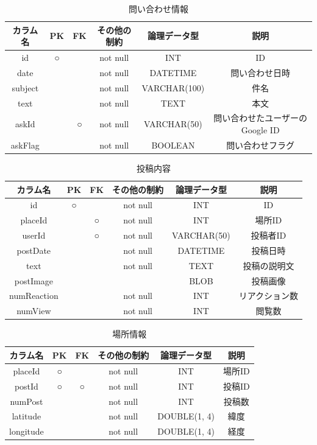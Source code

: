 \begin{table}[H]
    \centering
    \caption{問い合わせ情報}
    \label{tb:ask}
    \begin{tabular}{|c|c|c|c|c|c|} \hline
        カラム名 & PK & FK & その他の制約 & 論理データ型 & 説明 \\ \hline\hline
        id & ○ & & not null & INT & ID \\ \hline
        date & & & not null & DATETIME & 問い合わせ日時 \\ \hline
        subject & & & not null & VARCHAR(100) & 件名 \\ \hline
        text & & & not null & TEXT & 本文 \\ \hline
        askId & & ○ & not null & VARCHAR(50) & 問い合わせたユーザーのGoogle ID \\ \hline
        askFlag & & & not null & BOOLEAN & 問い合わせフラグ \\ \hline
    \end{tabular}
\end{table}

\begin{table}[H]
    \centering
    \caption{投稿内容}
    \label{tb:post}
    \begin{tabular}{|c|c|c|c|c|c|} \hline
        カラム名 & PK & FK & その他の制約 & 論理データ型 & 説明 \\ \hline\hline
        id & ○ & & not null & INT & ID \\ \hline
        placeId & & ○ & not null & INT & 場所ID \\ \hline
        userId & & ○ & not null & VARCHAR(50) & 投稿者ID \\ \hline
        postDate & & & not null & DATETIME & 投稿日時 \\ \hline
        text & & & not null & TEXT & 投稿の説明文 \\ \hline
        postImage & & & & BLOB & 投稿画像 \\ \hline
        numReaction & & & not null & INT & リアクション数 \\ \hline
        numView & & & not null & INT & 閲覧数 \\ \hline
    \end{tabular}
\end{table}

\begin{table}[H]
    \centering
    \caption{場所情報}
    \label{tb:place}
    \begin{tabular}{|c|c|c|c|c|c|} \hline
        カラム名 & PK & FK & その他の制約 & 論理データ型 & 説明 \\ \hline\hline
        placeId & ○ & & not null & INT & 場所ID \\ \hline
        postId & ○ & ○ & not null & INT & 投稿ID \\ \hline
        numPost & & & not null & INT & 投稿数 \\ \hline
        latitude & & & not null & DOUBLE(1, 4) & 緯度 \\ \hline
        longitude & & & not null & DOUBLE(1, 4) & 経度 \\ \hline
    \end{tabular}
\end{table}

